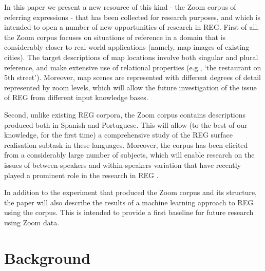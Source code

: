 \documentclass{article}
\begin{document}
In this paper we present a new resource of this kind - the Zoom corpus of referring expressions - that has been collected for research purposes, and which is intended to open a number of new opportunities of research in REG. First of all, the Zoom corpus focuses on situations of reference in a domain that is considerably closer to real-world applications (namely, map images of existing cities). The target descriptions of map locations involve both singular and plural reference, and make extensive use of relational properties (e.g., `the restaurant on 5th street'). Moreover, map scenes are represented with different degrees of detail represented by zoom levels, which will allow the future investigation of the issue of REG from different input knowledge bases. 

Second, unlike existing REG corpora, the Zoom corpus contains descriptions produced both in Spanish and Portuguese. This will allow (to the best of our knowledge, for the first time) a comprehensive study of the REG surface realisation subtask in these languages. Moreover, the corpus has been elicited from a considerably large number of subjects, which will enable research on the issues of between-speakers and within-speakers variation that have recently played a prominent role in the research in REG \cite{trainable-speaker,romina-coling,non-det}.

In addition to the experiment that produced the Zoom corpus and its structure, the paper will also describe the results of a machine learning approach to REG using the corpus. This is intended to provide a first baseline for future research using Zoom data.




\section{Background}
\label{sec-background}
\end{document}
